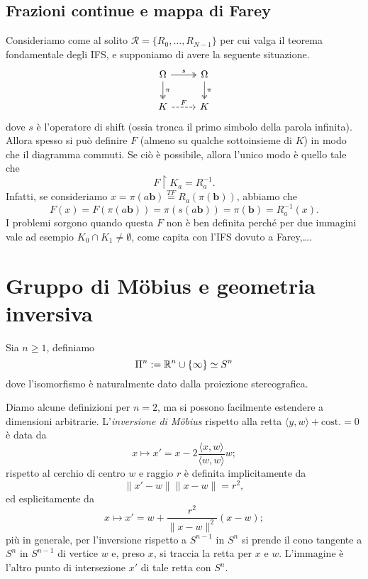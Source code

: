 \subsection{Frazioni continue e mappa di Farey}

Consideriamo come al solito $\mathcal R = \{R_{0}, \dots, R_{N-1}\}$ per cui valga il teorema fondamentale degli IFS, e supponiamo di avere la seguente situazione.
$$\begin{tikzcd}
\Omega \arrow[r, "s", two heads] \arrow[d, "\pi", two heads] & \Omega \arrow[d, "\pi", two heads] \\
K \arrow[r, "F", dashed]                                     & K                                 
\end{tikzcd}$$
dove $s$ è l'operatore di shift (ossia tronca il primo simbolo della parola infinita).
Allora spesso si può definire $F$ (almeno su qualche sottoinsieme di $K$) in modo che il diagramma commuti. 
Se ciò è possibile, allora l'unico modo è quello tale che 
$$F\upharpoonright K_{a} = R_{a}^{-1}.$$
Infatti, se consideriamo $x = \pi(a\mathbf b) \overset{TF}{=} R_{a}(\pi(\mathbf b))$, abbiamo che 
$$F(x) = F(\pi(a\mathbf b)) = \pi(s(a\mathbf b)) = \pi(\mathbf b) = R_{a}^{-1}(x).$$
I problemi sorgono quando questa $F$ non è ben definita perché per due immagini vale ad esempio $K_{0}\cap K_{1}\neq\emptyset$, come capita con l'IFS dovuto a Farey,\dots.


\section{Gruppo di Möbius e geometria inversiva}

Sia $n\geq1$, definiamo 
$$\Pi^{n}:=\mathbb{R}^{n}\cup\{\infty\} \simeq S^{n}$$
dove l'isomorfismo è naturalmente dato dalla proiezione stereografica. 

Diamo alcune definizioni per $n=2$, ma si possono facilmente estendere a dimensioni arbitrarie. 
L'\emph{inversione di Möbius} rispetto alla retta $\langle y,w\rangle + \text{cost.} =0$ è data da 
$$x\mapsto x' = x - 2\frac{\langle x, w\rangle}{\langle w, w\rangle}w;$$
rispetto al cerchio di centro $w$ e raggio $r$ è definita implicitamente da 
$$\|x'-w\|\|x-w\| = r^{2},$$
ed esplicitamente da 
$$x\mapsto x' = w + \frac{r^{2}}{\|x-w\|^{2}}(x-w);$$
più in generale, per l'inversione rispetto a $S^{n-1}$ in $S^{n}$ si prende il cono tangente a $S^{n}$ in $S^{n-1}$ di vertice $w$ e, preso $x$, si traccia la retta per $x$ e $w$. L'immagine è l'altro punto di intersezione $x'$ di tale retta con $S^{n}$.

